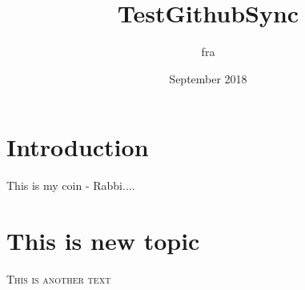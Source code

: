 \documentclass{article}
\title{TestGithubSync}
\author{fra }
\date{September 2018}
\begin{document}
\maketitle

\section{Introduction}

This is my coin - Rabbi....

\section{This is new topic}

\textsc{This is another text}
\end{document}
